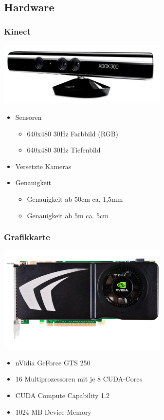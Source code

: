 \documentclass[compress]{beamer}
\begin{document}
\subsection{Hardware}

\begin{frame}
\frametitle{Kinect}

\hspace*{1.8cm}\includegraphics[width=8.5cm]{kin.jpg}

\begin{itemize}
	\item Sensoren
	\begin{itemize}
		\item 640x480 \@ 30Hz Farbbild (RGB)
		\item 640x480 \@ 30Hz Tiefenbild
	\end{itemize}
    \item Versetzte Kameras
	\item Genauigkeit
	\begin{itemize}
		\item Genauigkeit ab 50cm ca. 1,5mm
		\item Genauigkeit ab 5m ca. 5cm
	\end{itemize}
\end{itemize}
\end{frame}

\begin{frame}
\frametitle{Grafikkarte}

\hspace*{1.8cm}\includegraphics[width=8.5cm]{gts250.png}

\begin{itemize}
	\item nVidia GeForce GTS 250
	\item 16 Multiprozessoren mit je 8 CUDA-Cores
    \item CUDA Compute Capability 1.2
	\item 1024 MB Device-Memory	
\end{itemize}
\end{frame}
\end{document}
